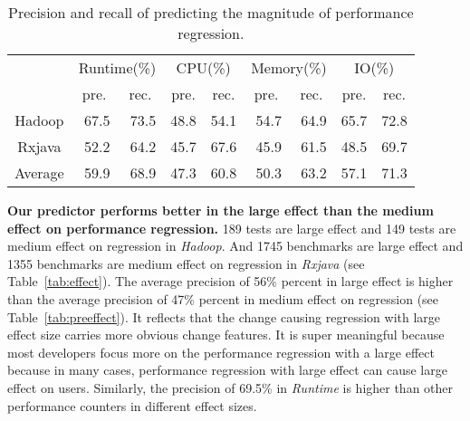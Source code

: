 \begin{table}[]
	\centering
	\footnotesize
	\caption{Precision and recall of predicting the magnitude of performance regression.}
	\label{tab:ordinal}
\begin{tabular}{|c|r|r|r|r|r|r|r|r|}
	\hline
	\multirow{2}{*}{}             & \multicolumn{2}{c|}{Runtime(\%)}                      & \multicolumn{2}{c|}{CPU(\%)}                          & \multicolumn{2}{c|}{Memory(\%)}                       & \multicolumn{2}{c|}{IO(\%)}                           \\ \cline{2-9} 
	& \multicolumn{1}{c|}{pre.} & \multicolumn{1}{c|}{rec.} & \multicolumn{1}{c|}{pre.} & \multicolumn{1}{c|}{rec.} & \multicolumn{1}{c|}{pre.} & \multicolumn{1}{c|}{rec.} & \multicolumn{1}{c|}{pre.} & \multicolumn{1}{c|}{rec.} \\ \hline
	Hadoop                        & 67.5                      & 73.5                      & 48.8                      & 54.1                      & 54.7                      & 64.9                      & 65.7                      & 72.8                      \\ \hline
	Rxjava                        & 52.2                      & 64.2                      & 45.7                      & 67.6                      & 45.9                      & 61.5                      & 48.5                      & 69.7                      \\ \hline
	\multicolumn{1}{|l|}{Average} & 59.9                      & 68.9                      & 47.3                      & 60.8                      & 50.3                      & 63.2                      & 57.1                      & 71.3                      \\ \hline
\end{tabular}
\end{table}

\textbf{Our predictor performs better in the large effect than the medium effect on performance regression.} 189 tests are large effect and 149 tests are medium effect on regression in \emph{Hadoop}. And 1745 benchmarks are large effect and 1355 benchmarks are medium effect on regression in \emph{Rxjava} (see Table~\ref{tab:effect}). The average precision of 56\% percent in large effect is higher than the average precision of 47\% percent in medium effect on regression (see Table~\ref{tab:preeffect}). It reflects that the change causing regression with large effect size carries more obvious change features. It is super meaningful because most developers focus more on the performance regression with a large effect because in many cases, performance regression with large effect can cause large effect on users. Similarly, the precision of 69.5\% in \emph{Runtime} is higher than other performance counters in different effect sizes.

